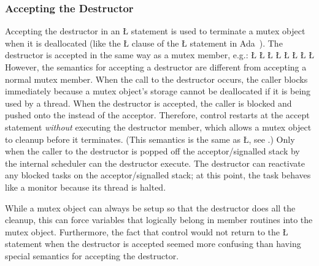 \documentclass[openright,twoside]{report}
\begin{document}
\subsubsection{Accepting the Destructor}
\label{s:AcceptingDestructor}

Accepting the destructor in an \LGinlinetrue\LGbegin\lgrinde\L{}\endlgrinde\LGend{} statement is used to terminate a mutex object when it is deallocated (like the \LGinlinetrue\LGbegin\lgrinde\L{}\endlgrinde\LGend{} clause of the \LGinlinetrue\LGbegin\lgrinde\L{}\endlgrinde\LGend{} statement in Ada~\cite[Sections 9.4, 9.7.1]{Ada}).
The destructor is accepted in the same way as a mutex member, e.g.:
\LGinlinefalse\LGbegin\lgrinde
\L{}
\L{}
\CE{}\L{\LB{}}
\L{\LB{}}
\CE{}\L{\LB{}}
\CE{}\L{\LB{}}
\CE{}\L{\LB{\}}}
\L{}
\CE{}\endlgrinde\LGend
However, the semantics for accepting a destructor are different from accepting a normal mutex member.
When the call to the destructor occurs, the caller blocks immediately because a mutex object's storage cannot be deallocated if it is being used by a thread.
When the destructor is accepted, the caller is blocked and pushed onto the  instead of the acceptor.
Therefore, control restarts at the accept statement \emph{without} executing the destructor member, which allows a mutex object to cleanup before it terminates.
(This semantics is the same as \LGinlinetrue\LGbegin\lgrinde\L{}\endlgrinde\LGend{}, see .)
Only when the caller to the destructor is popped off the acceptor/signalled stack by the internal scheduler can the destructor execute.
The destructor can reactivate any blocked tasks on the acceptor/signalled stack;
at this point, the task behaves like a monitor because its thread is halted.

\begin{annotation}
While a mutex object can always be setup so that the destructor does all the cleanup, this can force variables that logically belong in member routines into the mutex object.
Furthermore, the fact that control would not return to the \LGinlinetrue\LGbegin\lgrinde\L{}\endlgrinde\LGend{} statement when the destructor is accepted seemed more confusing than having special semantics for accepting the destructor.
\end{annotation}
\end{document}
